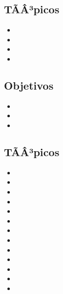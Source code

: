 \subsection*{TÃÂ³picos}
\begin{itemize}
	\item \ALSEISTopicDefinicion
	\item \ALSEISTopicNP
	\item \ALSEISTopicProblemas
	\item \ALSEISTopicTecnicas
\end{itemize}

\subsection*{Objetivos}
\begin{itemize}
	\item \ALSEISObjUNO
	\item \ALSEISObjDOS
	\item \ALSEISObjTRES
\end{itemize}

\subsection{\ALSIETEDef}\label{sec:BOK-AL7}

\subsection*{TÃÂ³picos}
\begin{itemize}
	\item \ALSIETETopicAutomatas
	\item \ALSIETETopicAutomatasfinitos
	\item \ALSIETETopicEquivalencias
	\item \ALSIETETopicExpresiones
	\item \ALSIETETopicEl
	\item \ALSIETETopicAutomatasde
	\item \ALSIETETopicRelacion
	\item \ALSIETETopicPropiedades
	\item \ALSIETETopicMaquinas
	\item \ALSIETETopicMaquinasde
	\item \ALSIETETopicConjuntos
	\item \ALSIETETopicLa
	\item \ALSIETETopicLatesis
\end{itemize}

